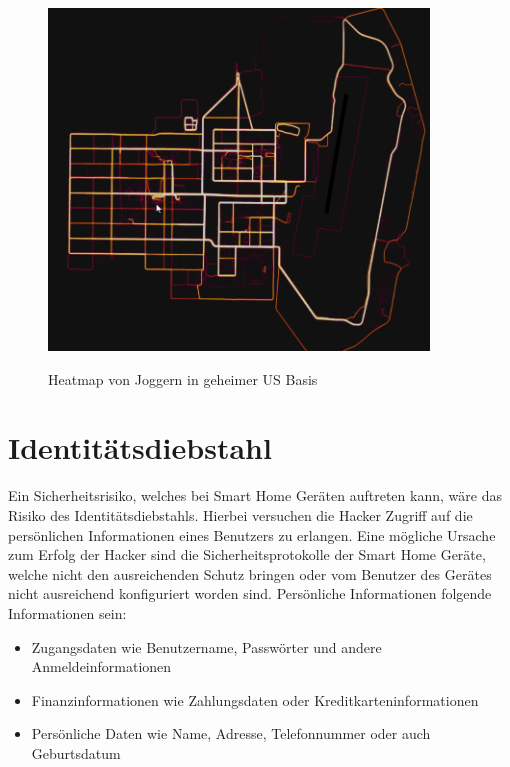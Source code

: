 \documentclass[12pt, a4paper, onecolumn, oneside, toc=bibliographynumbered, liststotoc]{scrreprt} %
\begin{document}
\begin{figure}[htpb]
	\centering
	\caption{Heatmap von Joggern in geheimer US Basis}
	\includegraphics[width=0.9\textwidth]{Heatmap.png}
	\label{Heatmap}
\end{figure} 

        \section {Identitätsdiebstahl}
        Ein Sicherheitsrisiko, welches bei Smart Home Geräten auftreten kann, wäre das Risiko des Identitätsdiebstahls. Hierbei versuchen die Hacker Zugriff auf die persönlichen Informationen eines Benutzers zu erlangen. Eine mögliche Ursache zum Erfolg der Hacker sind die Sicherheitsprotokolle der Smart Home Geräte, welche nicht den ausreichenden Schutz bringen oder vom Benutzer des Gerätes nicht ausreichend konfiguriert worden sind. 
        Persönliche Informationen folgende Informationen sein:
        \begin{itemize}
          \item Zugangsdaten wie Benutzername, Passwörter und andere Anmeldeinformationen
          \item Finanzinformationen wie Zahlungsdaten oder Kreditkarteninformationen 
          \item Persönliche Daten wie Name, Adresse, Telefonnummer oder auch Geburtsdatum
        \end{itemize}
        
\end{document}
